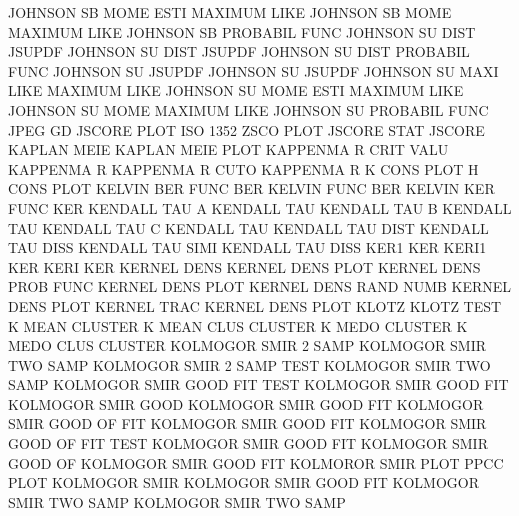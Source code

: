 JOHNSON  SB   MOME ESTI                 MAXIMUM  LIKE
JOHNSON  SB   MOME                      MAXIMUM  LIKE
JOHNSON  SB                             PROBABIL FUNC
JOHNSON  SU   DIST                      JSUPDF
JOHNSON  SU   DIST                      JSUPDF
JOHNSON  SU   DIST                      PROBABIL FUNC
JOHNSON  SU                             JSUPDF
JOHNSON  SU                             JSUPDF
JOHNSON  SU   MAXI LIKE                 MAXIMUM  LIKE
JOHNSON  SU   MOME ESTI                 MAXIMUM  LIKE
JOHNSON  SU   MOME                      MAXIMUM  LIKE
JOHNSON  SU                             PROBABIL FUNC
JPEG                                    GD
JSCORE   PLOT                           ISO      1352 ZSCO PLOT
JSCORE   STAT                           JSCORE
KAPLAN   MEIE                           KAPLAN   MEIE PLOT
KAPPENMA R    CRIT VALU                 KAPPENMA R
KAPPENMA R    CUTO                      KAPPENMA R
K        CONS PLOT                      H        CONS PLOT
KELVIN   BER  FUNC                      BER
KELVIN   FUNC                           BER
KELVIN   KER  FUNC                      KER
KENDALL  TAU  A                         KENDALL  TAU
KENDALL  TAU  B                         KENDALL  TAU
KENDALL  TAU  C                         KENDALL  TAU
KENDALL  TAU  DIST                      KENDALL  TAU  DISS
KENDALL  TAU  SIMI                      KENDALL  TAU  DISS
KER1                                    KER
KERI1                                   KER
KERI                                    KER
KERNEL   DENS                           KERNEL   DENS PLOT
KERNEL   DENS PROB FUNC                 KERNEL   DENS PLOT
KERNEL   DENS RAND NUMB                 KERNEL   DENS PLOT
KERNEL   TRAC                           KERNEL   DENS PLOT
KLOTZ                                   KLOTZ    TEST
K        MEAN                           CLUSTER
K        MEAN CLUS                      CLUSTER
K        MEDO                           CLUSTER
K        MEDO CLUS                      CLUSTER
KOLMOGOR SMIR 2    SAMP                 KOLMOGOR SMIR TWO  SAMP
KOLMOGOR SMIR 2    SAMP TEST            KOLMOGOR SMIR TWO  SAMP
KOLMOGOR SMIR GOOD FIT  TEST            KOLMOGOR SMIR GOOD FIT
KOLMOGOR SMIR GOOD                      KOLMOGOR SMIR GOOD FIT
KOLMOGOR SMIR GOOD OF   FIT             KOLMOGOR SMIR GOOD FIT
KOLMOGOR SMIR GOOD OF   FIT  TEST       KOLMOGOR SMIR GOOD FIT
KOLMOGOR SMIR GOOD OF                   KOLMOGOR SMIR GOOD FIT
KOLMOROR SMIR PLOT                      PPCC     PLOT
KOLMOGOR SMIR                           KOLMOGOR SMIR GOOD FIT
KOLMOGOR SMIR TWO  SAMP                 KOLMOGOR SMIR TWO  SAMP
